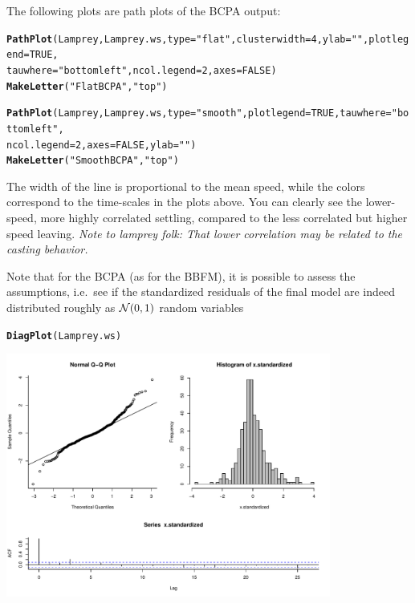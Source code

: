\documentclass[10pt]{article}\usepackage{graphicx, color}
\makeatletter
\newcommand{\hlfunctioncall}[1]{\textcolor[rgb]{0.501960784313725,0,0.329411764705882}{\textbf{#1}}}%
\newcommand{\hlstring}[1]{\textcolor[rgb]{0.6,0.6,1}{#1}}%
\newenvironment{kframe}{%
 \def\at@end@of@kframe{}%
 \ifinner\ifhmode%
  \def\at@end@of@kframe{\end{minipage}}%
  \begin{minipage}{\columnwidth}%
 \fi\fi%
 \def\FrameCommand##1{\hskip\@totalleftmargin \hskip-\fboxsep
 \colorbox{shadecolor}{##1}\hskip-\fboxsep
     \hskip-\linewidth \hskip-\@totalleftmargin \hskip\columnwidth}%
 \MakeFramed {\advance\hsize-\width
   \@totalleftmargin\z@ \linewidth\hsize
   \@setminipage}}%
 {\par\unskip\endMakeFramed%
 \at@end@of@kframe}
\newenvironment{knitrout}{}{} %
\makeatother
\begin{document}
The following plots are path plots of the BCPA output:
\begin{knitrout}
\color{fgcolor}\begin{kframe}
\begin{alltt}
\hlfunctioncall{PathPlot}(Lamprey, Lamprey.ws, type = \hlstring{"flat"}, clusterwidth = 4, ylab = \hlstring{""}, plotlegend = TRUE, 
    tauwhere = \hlstring{"bottomleft"}, ncol.legend = 2, axes = FALSE)
\hlfunctioncall{MakeLetter}(\hlstring{"Flat BCPA"}, \hlstring{"top"})

\hlfunctioncall{PathPlot}(Lamprey, Lamprey.ws, type = \hlstring{"smooth"}, plotlegend = TRUE, tauwhere = \hlstring{"bottomleft"}, 
    ncol.legend = 2, axes = FALSE, ylab = \hlstring{""})
\hlfunctioncall{MakeLetter}(\hlstring{"Smooth BCPA"}, \hlstring{"top"})
\end{alltt}
\end{kframe}
\end{knitrout}


The width of the line is proportional to the mean speed, while the colors correspond to the time-scales in the plots above.  You can clearly see the lower-speed, more highly correlated settling, compared to the less correlated but higher speed leaving.  \emph{Note to lamprey folk: That lower correlation may be related to the casting behavior.}

Note that for the BCPA (as for the BBFM), it is possible to assess the assumptions, i.e.~see if the standardized residuals of the final model are indeed distributed roughly as ${\cal N}(0,1)$ random variables

\begin{knitrout}
\color{fgcolor}\begin{kframe}
\begin{alltt}
\hlfunctioncall{DiagPlot}(Lamprey.ws)
\end{alltt}
\end{kframe}
\includegraphics[width=0.8\textwidth]{figure/DiagnosticPlot} 

\end{knitrout}
\end{document}
